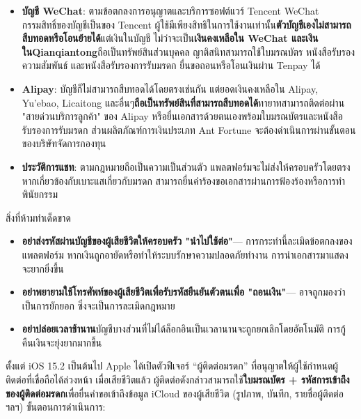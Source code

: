 \begin{itemize}
  \item \textbf{บัญชี WeChat}: ตามข้อตกลงการอนุญาตและบริการซอฟต์แวร์ Tencent WeChat กรรมสิทธิ์ของบัญชีเป็นของ Tencent ผู้ใช้มีเพียงสิทธิในการใช้งานเท่านั้น\textbf{ตัวบัญชีเองไม่สามารถสืบทอดหรือโอนย้ายได้}แต่เงินในบัญชี ไม่ว่าจะเป็น\textbf{เงินคงเหลือใน WeChat และเงินในQianqiantong}ถือเป็นทรัพย์สินส่วนบุคคล ญาติสนิทสามารถใช้ใบมรณบัตร หนังสือรับรองความสัมพันธ์ และหนังสือรับรองการรับมรดก ยื่นขอถอนหรือโอนเงินผ่าน Tenpay ได้
  \item \textbf{Alipay}: บัญชีก็ไม่สามารถสืบทอดได้โดยตรงเช่นกัน แต่ยอดเงินคงเหลือใน Alipay, Yu'ebao, Licaitong และอื่นๆ\textbf{ถือเป็นทรัพย์สินที่สามารถสืบทอดได้}ทายาทสามารถติดต่อผ่าน "สายด่วนบริการลูกค้า" ของ Alipay หรือยื่นเอกสารด้วยตนเองพร้อมใบมรณบัตรและหนังสือรับรองการรับมรดก ส่วนผลิตภัณฑ์การเงินประเภท Ant Fortune จะต้องดำเนินการผ่านขั้นตอนของบริษัทจัดการกองทุน
  \item \textbf{ประวัติการแชท}: ตามกฎหมายถือเป็นความเป็นส่วนตัว แพลตฟอร์มจะไม่ส่งให้ครอบครัวโดยตรง หากเกี่ยวข้องกับเบาะแสเกี่ยวกับมรดก สามารถยื่นคำร้องขอเอกสารผ่านการฟ้องร้องหรือการทำพินัยกรรม
\end{itemize}

\begin{tcbwarn}{สิ่งที่ห้ามทำเด็ดขาด}
\begin{itemize}
  \item \textbf{อย่าส่งรหัสผ่านบัญชีของผู้เสียชีวิตให้ครอบครัว "นำไปใช้ต่อ"}— การกระทำนี้ละเมิดข้อตกลงของแพลตฟอร์ม หากเงินถูกอายัดหรือทำให้ระบบรักษาความปลอดภัยทำงาน การนำเอกสารมาแสดงจะยากยิ่งขึ้น
  \item \textbf{อย่าพยายามใช้โทรศัพท์ของผู้เสียชีวิตเพื่อรับรหัสยืนยันตัวตนเพื่อ "ถอนเงิน"}— อาจถูกมองว่าเป็นการยักยอก ซึ่งจะเป็นการละเมิดกฎหมาย
  \item \textbf{อย่าปล่อยเวลาช้านาน}บัญชีบางส่วนที่ไม่ได้ล็อกอินเป็นเวลานานจะถูกยกเลิกโดยอัตโนมัติ การกู้คืนเงินจะยุ่งยากมากขึ้น
\end{itemize}

\end{tcbwarn}


ตั้งแต่ iOS 15.2 เป็นต้นไป Apple ได้เปิดตัวฟีเจอร์ “ผู้ติดต่อมรดก” ที่อนุญาตให้ผู้ใช้กำหนดผู้ติดต่อที่เชื่อถือได้ล่วงหน้า เมื่อเสียชีวิตแล้ว ผู้ติดต่อดังกล่าวสามารถใช้\textbf{ใบมรณบัตร + รหัสการเข้าถึงของผู้ติดต่อมรดก}เพื่อยื่นคำขอเข้าถึงข้อมูล iCloud ของผู้เสียชีวิต (รูปภาพ, บันทึก, รายชื่อผู้ติดต่อ ฯลฯ) ขั้นตอนการดำเนินการ:

